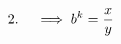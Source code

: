 \documentclass[preview]{standalone}
\begin{document}
\begin{align*}
\special{dvisvgm:raw <g id='unique000'>}2.\quad \implies b^k = \frac{x}{y}\special{dvisvgm:raw </g>}
\end{align*}
\end{document}
